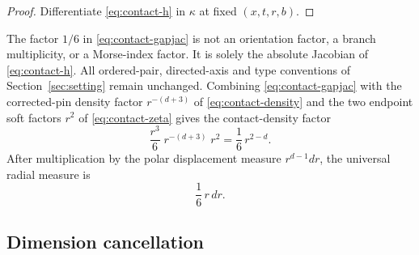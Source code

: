 \begin{proof}
Differentiate \eqref{eq:contact-h} in $\kappa$ at fixed $(x,t,r,b)$.
\end{proof}

\begin{remark}\label{rem:contact-gap}
The factor $1/6$ in \eqref{eq:contact-gapjac} is not an orientation factor, a branch multiplicity, or a Morse-index factor. It is solely the absolute Jacobian of \eqref{eq:contact-h}. All ordered-pair, directed-axis and type conventions of Section~\ref{sec:setting} remain unchanged. Combining \eqref{eq:contact-gapjac} with the corrected-pin density factor $r^{-(d+3)}$ of \eqref{eq:contact-density} and the two endpoint soft factors $r^2$ of \eqref{eq:contact-zeta} gives the contact-density factor
\begin{equation}\label{eq:contact-factor}
\frac{r^3}6\;r^{-(d+3)}\;r^2=\frac16\,r^{2-d}.
\end{equation}
After multiplication by the polar displacement measure $r^{d-1}dr$, the universal radial measure is
\begin{equation}\label{eq:contact-universal}
\frac16\,r\,dr .
\end{equation}
\end{remark}

\subsection{Dimension cancellation}\label{ssec:contact-cancel}

